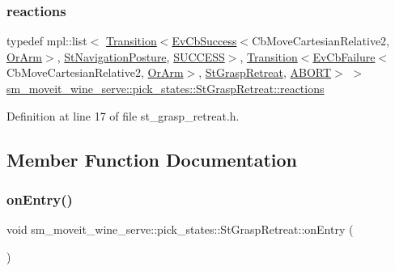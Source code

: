 \subsubsection{\texorpdfstring{reactions}{reactions}}
{\footnotesize\ttfamily typedef mpl\+::list$<$ \hyperlink{classsmacc_1_1Transition}{Transition}$<$\hyperlink{structsmacc_1_1EvCbSuccess}{Ev\+Cb\+Success}$<$Cb\+Move\+Cartesian\+Relative2, \hyperlink{classsm__moveit__wine__serve_1_1OrArm}{Or\+Arm}$>$, \hyperlink{structsm__moveit__wine__serve_1_1StNavigationPosture}{St\+Navigation\+Posture}, \hyperlink{structsmacc_1_1default__transition__tags_1_1SUCCESS}{S\+U\+C\+C\+E\+SS}$>$, \hyperlink{classsmacc_1_1Transition}{Transition}$<$\hyperlink{structsmacc_1_1EvCbFailure}{Ev\+Cb\+Failure}$<$Cb\+Move\+Cartesian\+Relative2, \hyperlink{classsm__moveit__wine__serve_1_1OrArm}{Or\+Arm}$>$, \hyperlink{structsm__moveit__wine__serve_1_1pick__states_1_1StGraspRetreat}{St\+Grasp\+Retreat}, \hyperlink{structsmacc_1_1default__transition__tags_1_1ABORT}{A\+B\+O\+RT}$>$ $>$ \hyperlink{structsm__moveit__wine__serve_1_1pick__states_1_1StGraspRetreat_a9be94d330d253cec5a7ac2a740bc6d38}{sm\+\_\+moveit\+\_\+wine\+\_\+serve\+::pick\+\_\+states\+::\+St\+Grasp\+Retreat\+::reactions}}



Definition at line 17 of file st\+\_\+grasp\+\_\+retreat.\+h.



\subsection{Member Function Documentation}
\mbox{\label{structsm__moveit__wine__serve_1_1pick__states_1_1StGraspRetreat_ad6a351b8e000a68d84810057ce336ebb}} 
\subsubsection{\texorpdfstring{on\+Entry()}{onEntry()}}
{\footnotesize\ttfamily void sm\+\_\+moveit\+\_\+wine\+\_\+serve\+::pick\+\_\+states\+::\+St\+Grasp\+Retreat\+::on\+Entry (\begin{DoxyParamCaption}{ }\end{DoxyParamCaption})\hspace{0.3cm}{\ttfamily [inline]}}



